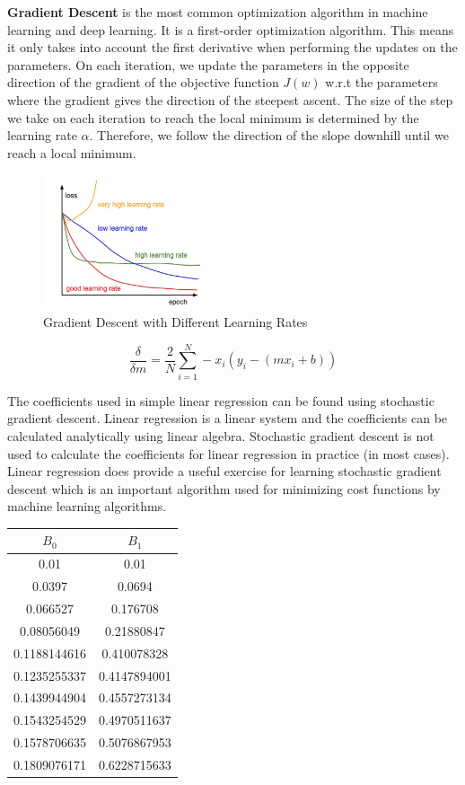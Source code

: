 \documentclass[conference,compsoc]{IEEEtran}
\begin{document}
\textbf{Gradient Descent} is the most common optimization algorithm in machine learning and deep learning. It is a first-order optimization algorithm. This means it only takes into account the first derivative when performing the updates on the parameters. On each iteration, we update the parameters in the opposite direction of the gradient of the objective function $J(w)$ w.r.t the parameters where the gradient gives the direction of the steepest ascent. The size of the step we take on each iteration to reach the local minimum is determined by the learning rate $α$. Therefore, we follow the direction of the slope downhill until we reach a local minimum.

\begin{figure}[H]
    \centering
    \includegraphics[width=6cm]{images/gradient-descent-different-learning-rates.png}
    \caption{Gradient Descent with Different Learning Rates}
\end{figure}

\[
    \frac{\delta}{\delta m} = \frac{2}{N} \sum_{i=1}^{N} - x_{i}(y_{i} - (mx_{i} +b))
\]

The coefficients used in simple linear regression can be found using stochastic gradient descent. Linear regression is a linear system and the coefficients can be calculated analytically using linear algebra. Stochastic gradient descent is not used to calculate the coefficients for linear regression in practice (in most cases). Linear regression does provide a useful exercise for learning stochastic gradient descent which is an important algorithm used for minimizing cost functions by machine learning algorithms.

\begin{center}
\begin{tabular}{|c|c|}
    \hline
    $B_{0}$ & $B_{1}$ \\ [0.5ex]
    \hline
    0.01 & 0.01 \\
    \hline
    0.0397 & 0.0694 \\
    \hline
    0.066527 & 0.176708 \\
    \hline
    0.08056049 & 0.21880847 \\
    \hline
    0.1188144616 & 0.410078328 \\
    \hline
    0.1235255337 & 0.4147894001 \\
    \hline
    0.1439944904 & 0.4557273134 \\
    \hline
    0.1543254529 & 0.4970511637 \\
    \hline
    0.1578706635 & 0.5076867953 \\
    \hline
    0.1809076171 & 0.6228715633 \\
    \hline
\end{tabular}
\end{center}
\end{document}
